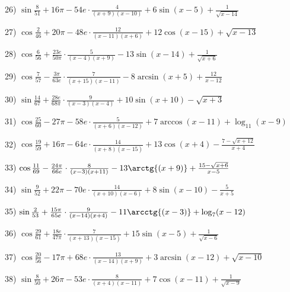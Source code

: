 \documentclass[11pt,ukrainian]{article}
\begin{document}
26) \space 
{ ${\sin\frac{8}{51}} + 16{\pi} - 54 e\cdot {\frac{4}{(x + 9)(x - 10)}} + {6\sin{(x - 5)}} + {\frac{1}{\sqrt{x - 14}}}$}
\smallskip\par
27) \space 
{ ${\cos\frac{2}{46}} + 20{\pi} - 48 e\cdot {\frac{12}{(x - 11)(x + 6)}} + {12\cos{(x - 15)}} + {\sqrt{x - 13}}$}
\smallskip\par
28) \space 
{ ${\cos\frac{6}{56}} + \frac{23 e}{50{\pi}}\cdot {\frac{5}{(x - 4)(x + 9)}} - {13\sin{(x - 14)}} + {\frac{1}{\sqrt{x + 6}}}$}
\smallskip\par
29) \space 
{ ${\cos\frac{7}{57}} - \frac{3{\pi}}{63 e}\cdot {\frac{7}{(x + 15)(x - 11)}} - {8\arcsin{(x + 5)}} + { \frac{12}{x - 12}}$}
\smallskip\par
30) \space 
{ ${\sin\frac{14}{67}} + \frac{28 e}{68{\pi}}\cdot {\frac{9}{(x - 3)(x - 4)}} + {10\sin{(x + 10)}} - {\sqrt{x + 3}}$}
\smallskip\par
31) \space 
{ ${\cos\frac{25}{60}} - 27{\pi} - 58 e\cdot {\frac{5}{(x + 6)(x - 12)}} + {7\arccos{(x - 11)}} + {\log_{11}(x - 9)}$}
\smallskip\par
32) \space 
{ ${\cos\frac{19}{59}} + 16{\pi} - 64 e\cdot {\frac{14}{(x + 8)(x - 15)}} + {13\cos{(x + 4)}} - {\frac{7 - \sqrt{x + 12}}{x + 4}}$}
\smallskip\par
33) \space 
{ ${\cos\frac{11}{69}} - \frac{24{\pi}}{66 e}\cdot {\frac{8}{(x - 3)(x + 11)}} - {13\arctg{(x + 9)}} + {\frac{15 - \sqrt{x + 6}}{x - 5}}$}
\smallskip\par
34) \space 
{ ${\sin\frac{9}{52}} + 22{\pi} - 70 e\cdot {\frac{14}{(x + 10)(x - 6)}} + {8\sin{(x - 10)}} - { \frac{5}{x + 5}}$}
\smallskip\par
35) \space 
{ ${\sin\frac{2}{53}} + \frac{15{\pi}}{65 e}\cdot {\frac{9}{(x - 14)(x + 4)}} - {11\arcctg{(x - 3)}} + {\log_{7}(x - 12)}$}
\smallskip\par
36) \space 
{ ${\cos\frac{29}{61}} + \frac{18 e}{47{\pi}}\cdot {\frac{7}{(x + 13)(x - 15)}} + {15\sin{(x - 5)}} + {\frac{1}{\sqrt{x - 6}}}$}
\smallskip\par
37) \space 
{ ${\cos\frac{20}{56}} - 17{\pi} + 68 e\cdot {\frac{13}{(x - 14)(x + 9)}} + {3\arcsin{(x - 12)}} + {\sqrt{x - 10}}$}
\smallskip\par
38) \space 
{ ${\sin\frac{8}{50}} + 26{\pi} - 53 e\cdot {\frac{8}{(x + 4)(x - 11)}} + {7\cos{(x - 11)}} + {\frac{1}{\sqrt{x - 9}}}$}
\smallskip\par
\end{document}
